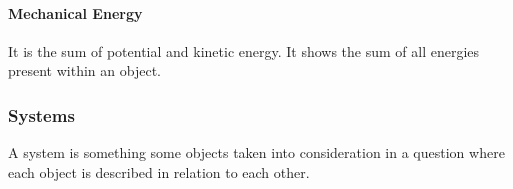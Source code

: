 \documentclass{article} %
\theoremstyle{theorem}
\theoremstyle{definition}
\begin{document}
            \paragraph{Mechanical Energy}
            It is the sum of potential and kinetic energy. It shows the sum of all energies present within an object.
        \subsubsection{Systems}
            A system is something some objects taken into consideration in a question where each object is described in relation to each other.
\end{document}

